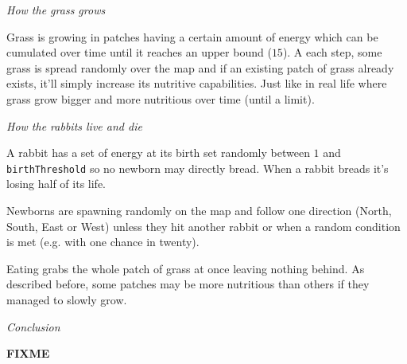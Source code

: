 \documentclass[11pt,a4paper]{article}
\begin{document}
\newpage
\medskip
\emph{How the grass grows}

Grass is growing in patches having a certain amount of energy which can be
cumulated over time until it reaches an upper bound ($15$). A each step, some
grass is spread randomly over the map and if an existing patch of grass already
exists, it'll simply increase its nutritive capabilities. Just like in real
life where grass grow bigger and more nutritious over time (until a limit).

\medskip
\emph{How the rabbits live and die}

A rabbit has a set of energy at its birth set randomly between $1$ and
\texttt{birthThreshold} so no newborn may directly bread. When a rabbit breads
it's losing half of its life.

Newborns are spawning randomly on the map and follow one direction (North,
South, East or West) unless they hit another rabbit or when a random condition
is met (e.g. with one chance in twenty).

Eating grabs the whole patch of grass at once leaving nothing behind. As
described before, some patches may be more nutritious than others if they
managed to slowly grow.

\medskip
\emph{Conclusion}

\textbf{FIXME}
\end{document}
